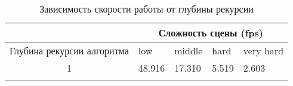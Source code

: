 \begin{center}
\begin{longtable}{|c|p{2cm}|p{2cm}|p{2cm}|p{2cm}|}
\hline & \multicolumn{4}{c|}{Сложность сцены (fps)} \\ 
\hline Глубина рекурсии алгоритма & low & middle & hard &  very hard\\ 
\hline 1 &  48.916 & 17.310 & 5.519 & 2.603 \\ 
\hline
\caption{Зависимость скорости работы от глубины рекурсии}\label{tab:performance_d}\end{longtable}
\end{center}

